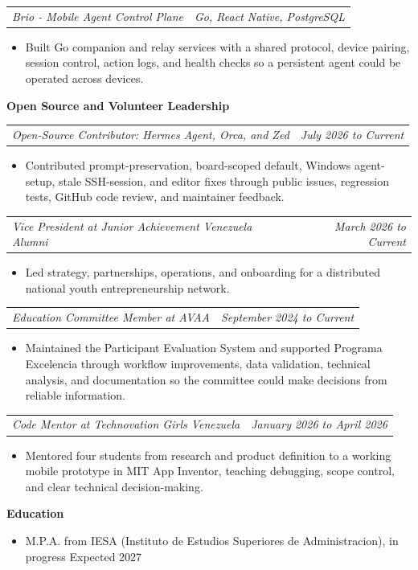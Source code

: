 \documentclass[10pt,letterpaper]{article}
\makeatletter
\newcommand{\bodyfont}{\fontsize{10.5}{15.75}\selectfont}
\newcommand{\sectiontitle}[1]{%
  \vspace{4pt}
  {\bodyfont\textbf{#1}}\par
  \nopagebreak[4]
  \vspace{2pt}
}
\newcommand{\roleline}[2]{%
  \begin{tabularx}{\textwidth}{@{}Xr@{}}
    \bodyfont\textit{#1} & \bodyfont\textit{#2}
  \end{tabularx}
  \nopagebreak[4]
  \vspace{1pt}
}
\makeatother
\begin{document}
\vspace{3pt}
\roleline{Brio - Mobile Agent Control Plane}{Go, React Native, PostgreSQL}
\begin{itemize}
  \item Built Go companion and relay services with a shared protocol, device pairing, session control, action logs, and health checks so a persistent agent could be operated across devices.
\end{itemize}

\sectiontitle{Open Source and Volunteer Leadership}

\roleline{Open-Source Contributor: Hermes Agent, Orca, and Zed}{July 2026 to Current}
\begin{itemize}
  \item Contributed prompt-preservation, board-scoped default, Windows agent-setup, stale SSH-session, and editor fixes through public issues, regression tests, GitHub code review, and maintainer feedback.
\end{itemize}

\vspace{3pt}
\roleline{Vice President at Junior Achievement Venezuela Alumni}{March 2026 to Current}
\begin{itemize}
  \item Led strategy, partnerships, operations, and onboarding for a distributed national youth entrepreneurship network.
\end{itemize}

\vspace{3pt}
\roleline{Education Committee Member at AVAA}{September 2024 to Current}
\begin{itemize}
  \item Maintained the Participant Evaluation System and supported Programa Excelencia through workflow improvements, data validation, technical analysis, and documentation so the committee could make decisions from reliable information.
\end{itemize}

\vspace{3pt}
\roleline{Code Mentor at Technovation Girls Venezuela}{January 2026 to April 2026}
\begin{itemize}
  \item Mentored four students from research and product definition to a working mobile prototype in MIT App Inventor, teaching debugging, scope control, and clear technical decision-making.
\end{itemize}

\sectiontitle{Education}
\begin{itemize}
  \item M.P.A. from IESA (Instituto de Estudios Superiores de Administracion), in progress \hfill Expected 2027
\end{itemize}
\end{document}
